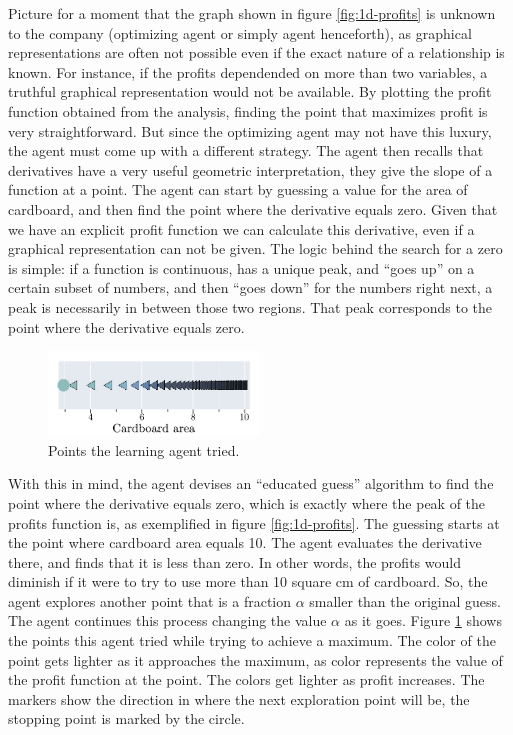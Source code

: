 Picture for a moment that the graph shown in figure \ref{fig:1d-profits} is
unknown to the company (optimizing agent or simply agent henceforth), as
graphical representations are often not possible even if the exact nature of a
relationship is known. For instance, if the profits dependended on more than two
variables, a truthful graphical representation would not be available. By
plotting the profit function obtained from the analysis, finding the point that
maximizes profit is very straightforward. But since the optimizing agent may not
have this luxury, the agent must come up with a different strategy. The agent
then recalls that derivatives have a very useful geometric interpretation, they
give the slope of a function at a point. The agent can start by guessing a value
for the area of cardboard, and then find the point where the derivative equals
zero. Given that we have an explicit profit function we can calculate this
derivative, even if a graphical representation can not be given. The logic
behind the search for a zero is simple: if a function is continuous, has a
unique peak, and ``goes up'' on a certain subset of numbers, and then ``goes
down'' for the numbers right next, a peak is necessarily in between those two
regions. That peak corresponds to the point where the derivative equals zero.

\begin{figure}
   \centering
   \includegraphics[width=0.5\textwidth]{img/gd-points.pdf} 
   \caption{Points the learning agent tried.}
   \label{fig:gd-points}
\end{figure}

With this in mind, the agent devises an ``educated guess'' algorithm to find the
point where the derivative equals zero, which is exactly where the peak of the
profits function is, as exemplified in figure \ref{fig:1d-profits}. The guessing
starts at the point where cardboard area equals 10. The agent evaluates the
derivative there, and finds that it is less than zero. In other words, the
profits would diminish if it were to try to use more than 10 square cm of
cardboard. So, the agent explores another point that is a fraction $\alpha$
smaller than the original guess. The agent continues this process changing the
value $\alpha$ as it goes. Figure \ref{fig:gd-points} shows the points this
agent tried while trying to achieve a maximum. The color of the point gets
lighter as it approaches the maximum, as color represents the value of the
profit function at the point. The colors get lighter as profit increases. The
markers show the direction in where the next exploration point will be, the
stopping point is marked by the circle.

